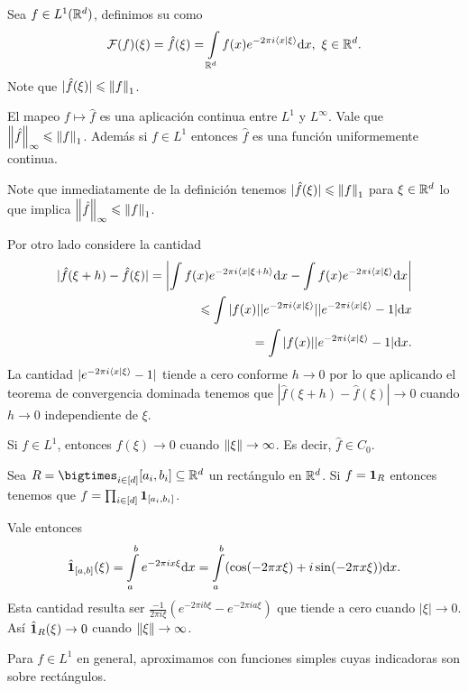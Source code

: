 \documentclass[12pt]{memoir}
\begin{document}
\begin{Def}
  Sea $f\in L^1(\mathbb{R}^d)$, definimos su  como
  $$\cF(f)(\xi)=\hat f(\xi)=\int\limits_{\bR^d}f(x)e^{-2\pi i\braket{x}{\xi}}\dd x,\ \xi\in\bR^d.$$
  Note que $|\hat{f}(\xi)|\leqslant \left\|f\right\|_1$.
\end{Def}

\begin{Th}
  El mapeo $f\mapsto\hat f$ es una aplicación continua entre $L^1$ y $L^\infty$.  Vale que $\left\|\hat f\right\|_\infty\leqslant\left\|f\right\|_1$. Además si $f\in L^1$ entonces $\hat f$ es una función uniformemente continua.
\end{Th}

\begin{ptcbp}
  Note que inmediatamente de la definición tenemos $|\hat{f}(\xi)|\leqslant\left\|f\right\|_1$ para $\xi\in\mathbb{R}^d$ lo que implica $\left\|\hat{f}\right\|_\infty\leqslant\left\|f\right\|_1$.\par
  Por otro lado considere la cantidad
  \begin{align*}
    |\hat{f}(\xi+h)-\hat{f}(\xi)|=\left|\int f(x)e^{-2\pi i\braket{x}{\xi+h}}\dd x-\int f(x)e^{-2\pi i\braket{x}{\xi}}\dd x\right|\\
  \leqslant \int|f(x)||e^{-2\pi i\braket{x}{\xi}}||e^{-2\pi i\braket{x}{\xi}}-1|\dd x\\
  =\int|f(x)||e^{-2\pi i\braket{x}{\xi}}-1|\dd x.
  \end{align*}
  La cantidad $|e^{-2\pi i\braket{x}{\xi}}-1|$ tiende a cero conforme $h\to 0$ por lo que aplicando el teorema de convergencia dominada tenemos que $|\hat{f}(\xi+h)-\hat{f}(\xi)|\to 0$ cuando $h\to 0$ independiente de $\xi$. 
\end{ptcbp}

\begin{Lem}
  Si $f\in L^1$, entonces $\hat{f}(\xi)\to 0$ cuando $\left\|\xi\right\|\to\infty$. Es decir, $\hat{f}\in C_0$.
\end{Lem}

\begin{ptcbp}
  Sea $R=\bigtimes_{i\in[d]}[a_i,b_i]\subseteq\bR^d$ un rectángulo en $\mathbb{R}^d$. Si $f=\mathbf{1}_R$ entonces tenemos que $f=\prod_{i\in[d]}\mathbf{1}_{[a_i,b_i]}$.\par
  Vale entonces 
  $$\hat{\mathbf{1}}_{[a,b]}(\xi)=\int\limits_a^be^{-2\pi ix\xi}\dd x=\int\limits_a^b(\cos(-2\pi x\xi)+i\sin(-2\pi x\xi))\dd x.$$
  Esta cantidad resulta ser $\frac{-1}{2\pi i\xi}(e^{-2\pi ib\xi}-e^{-2\pi ia\xi})$ que tiende a cero cuando $|\xi|\to 0$. Así $\hat{\mathbf{1}}_R(\xi)\to 0$ cuando $\left\|\xi\right\|\to\infty$.\par
  Para $f\in L^1$ en general, aproximamos con funciones simples cuyas indicadoras son sobre rectángulos.
\end{ptcbp}
\end{document}
